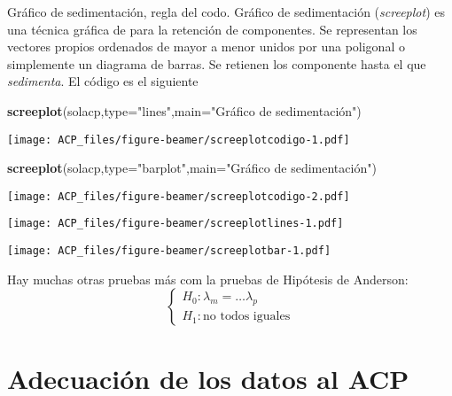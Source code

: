 \documentclass[
  spanish,
  ignorenonframetext,
]{beamer}
\newenvironment{Shaded}{\begin{snugshade}}{\end{snugshade}}
\newcommand{\DataTypeTok}[1]{\textcolor[rgb]{0.13,0.29,0.53}{#1}}
\newcommand{\KeywordTok}[1]{\textcolor[rgb]{0.13,0.29,0.53}{\textbf{#1}}}
\newcommand{\NormalTok}[1]{#1}
\newcommand{\StringTok}[1]{\textcolor[rgb]{0.31,0.60,0.02}{#1}}
\begin{document}
\begin{frame}[fragile]{Gráfico de sedimentación, regla del codo.}
\protect\hypertarget{gruxe1fico-de-sedimentaciuxf3n-regla-del-codo.}{}
Gráfico de sedimentación (\emph{screeplot}) es una técnica gráfica de
para la retención de componentes. Se representan los vectores propios
ordenados de mayor a menor unidos por una poligonal o simplemente un
diagrama de barras. Se retienen los componente hasta el que
\emph{sedimenta}. El código es el siguiente

\begin{Shaded}
\begin{Highlighting}[]
\KeywordTok{screeplot}\NormalTok{(solacp,}\DataTypeTok{type=}\StringTok{"lines"}\NormalTok{,}\DataTypeTok{main=}\StringTok{"Gráfico de sedimentación"}\NormalTok{)}
\end{Highlighting}
\end{Shaded}

\texttt{[image: ACP\_files/figure-beamer/screeplotcodigo-1.pdf]}

\begin{Shaded}
\begin{Highlighting}[]
\KeywordTok{screeplot}\NormalTok{(solacp,}\DataTypeTok{type=}\StringTok{"barplot"}\NormalTok{,}\DataTypeTok{main=}\StringTok{"Gráfico de sedimentación"}\NormalTok{)}
\end{Highlighting}
\end{Shaded}

\texttt{[image: ACP\_files/figure-beamer/screeplotcodigo-2.pdf]}

\texttt{[image: ACP\_files/figure-beamer/screeplotlines-1.pdf]}

\texttt{[image: ACP\_files/figure-beamer/screeplotbar-1.pdf]}

Hay muchas otras pruebas más com la pruebas de Hipótesis de Anderson:
\[\left\{ \begin{array}{l}
H_0: \lambda_m=\ldots\lambda_p\\ H_1: \mbox{no todos
iguales}\end{array}\right.\]
\end{frame}

\hypertarget{adecuaciuxf3n-de-los-datos-al-acp}{%
\section{Adecuación de los datos al
ACP}\label{adecuaciuxf3n-de-los-datos-al-acp}}
\end{document}
